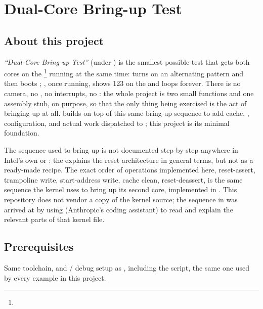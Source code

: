 \chapter{Dual-Core Bring-up Test}
\label{chap:fpgasteel-dualcore-bringup}

\section{About this project}
\label{sec:fpgasteel-dualcore-about}

\textit{``Dual-Core Bring-up Test''} (under ) is the smallest possible test that gets both  cores on the \footnote{} running at the same time:  turns on an alternating  pattern and then boots ; , once running, shows 123 on the  and loops forever. There is no camera, no , no interrupts, no : the whole project is two small  functions and one assembly stub, on purpose, so that the only thing being exercised is the act of bringing  up at all.  builds on top of this same bring-up sequence to add cache, ,  configuration, and actual work dispatched to ; this project is its minimal foundation.

The sequence used to bring  up is not documented step-by-step anywhere in Intel's own  \cite{CV-TRM} or : the  explains the reset architecture in general terms, but not as a ready-made recipe. The exact order of operations implemented here, reset-assert, trampoline write, start-address write, cache clean, reset-deassert, is the same sequence the  kernel uses to bring up its second core, implemented in . This repository does not vendor a copy of the  kernel source; the sequence in  was arrived at by using  (Anthropic's  coding assistant) to read and explain the relevant parts of that kernel file.

\section{Prerequisites}
\label{sec:fpgasteel-dualcore-prerequisites}

Same toolchain,  and / debug setup as , including the  script, the same one used by every example in this project.

